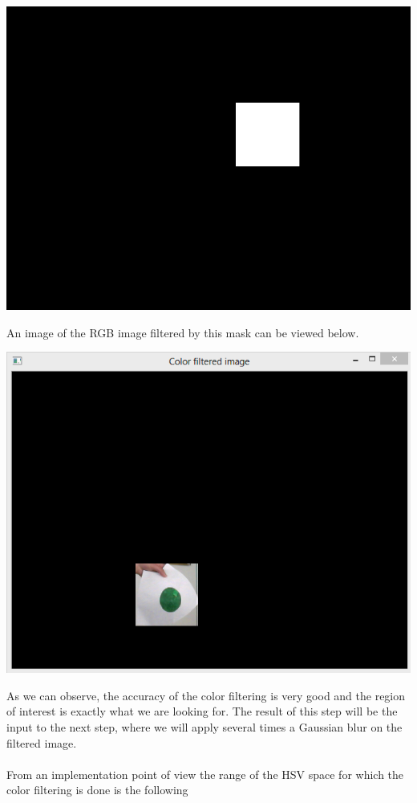 \begin{center}
	\includegraphics[scale=0.6]{images/color_mask.jpg}
	\label{fig:color_mask}
\end{center}

\noindent
An image of the RGB image filtered by this mask can be viewed below.

\begin{center}
	\includegraphics[scale=0.8]{images/color_filtered_image.png}
	\label{fig:color_filter}
\end{center}

\noindent
As we can observe, the accuracy of the color filtering is very good and the region of interest is exactly what we are looking for. The result of this step will be the input to the next step, where we will apply several times a Gaussian blur on the filtered image. 
\\\\
From an implementation point of view the range of the HSV space for which the color filtering is done is the following

